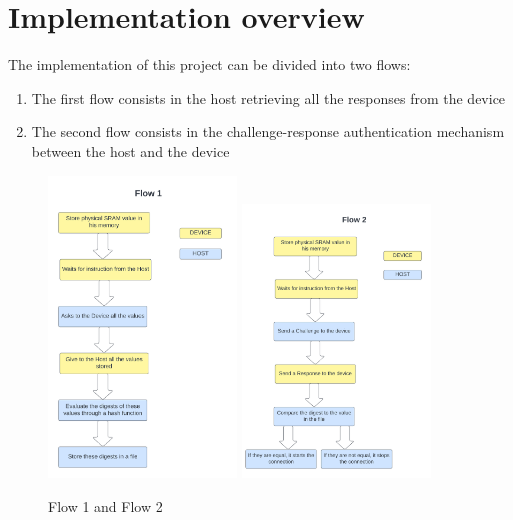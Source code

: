 

\section{Implementation overview}
The implementation of this project can be divided into two flows:
\begin{enumerate}
	\item The first flow consists in the host retrieving all the responses from the device 
	\item The second flow consists in the challenge-response authentication mechanism between the host and the device 
\end{enumerate}

\begin{figure}[H]
\centering
  \includegraphics[width=5cm]{images/flow_1.png}
  \includegraphics[width=5cm]{images/flow_2.png}
  \caption{Flow 1 and Flow 2}
  \label{fig:sub2}
\end{figure}

